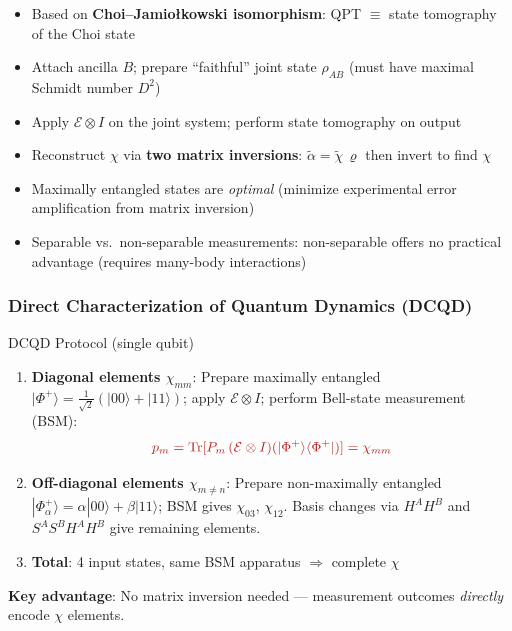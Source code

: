 \documentclass[10pt,a4paper]{article}
\begin{document}
\begin{itemize}
  \item Based on \textbf{Choi--Jamio\l{}kowski isomorphism}: QPT $\equiv$ state tomography of the Choi state
  \item Attach ancilla $B$; prepare ``faithful'' joint state $\rho_{AB}$ (must have maximal Schmidt number $D^2$)
  \item Apply $\mathcal{E} \otimes I$ on the joint system; perform state tomography on output
  \item Reconstruct $\chi$ via \textbf{two matrix inversions}: $\tilde{\alpha} = \tilde{\chi}\,\varrho$ then invert to find $\chi$
  \item Maximally entangled states are \emph{optimal} (minimize experimental error amplification from matrix inversion)
  \item Separable vs.\ non-separable measurements: non-separable offers no practical advantage (requires many-body interactions)
\end{itemize}

\subsubsection{Direct Characterization of Quantum Dynamics (DCQD)}

\begin{algorithmbox}{DCQD Protocol (single qubit)}
\begin{enumerate}
  \item \textbf{Diagonal elements $\chi_{mm}$}: Prepare maximally entangled $|\Phi^+\rangle = \frac{1}{\sqrt{2}}(|00\rangle + |11\rangle)$; apply $\mathcal{E} \otimes I$; perform Bell-state measurement (BSM):
  \[
    \textcolor{alertred}{p_m = \mathrm{Tr}[P_m\, (\mathcal{E}\otimes I)(|\Phi^+\rangle\langle\Phi^+|)] = \chi_{mm}}
  \]
  \item \textbf{Off-diagonal elements $\chi_{m\neq n}$}: Prepare non-maximally entangled $|\Phi^+_\alpha\rangle = \alpha|00\rangle + \beta|11\rangle$; BSM gives $\chi_{03}$, $\chi_{12}$. Basis changes via $H^A H^B$ and $S^A S^B H^A H^B$ give remaining elements.
  \item \textbf{Total}: 4 input states, same BSM apparatus $\Rightarrow$ complete $\chi$
\end{enumerate}
\end{algorithmbox}

\textcolor{alertred}{\textbf{Key advantage}}: No matrix inversion needed --- measurement outcomes \emph{directly} encode $\chi$ elements.
\end{document}
